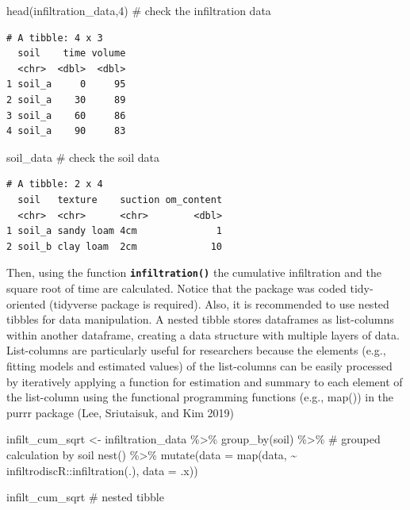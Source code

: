 \documentclass[
]{article}
\newenvironment{Shaded}{\begin{snugshade}}{\end{snugshade}}
\newcommand{\AttributeTok}[1]{\textcolor[rgb]{0.40,0.45,0.13}{#1}}
\newcommand{\CommentTok}[1]{\textcolor[rgb]{0.37,0.37,0.37}{#1}}
\newcommand{\DecValTok}[1]{\textcolor[rgb]{0.68,0.00,0.00}{#1}}
\newcommand{\FunctionTok}[1]{\textcolor[rgb]{0.28,0.35,0.67}{#1}}
\newcommand{\NormalTok}[1]{\textcolor[rgb]{0.00,0.23,0.31}{#1}}
\newcommand{\OtherTok}[1]{\textcolor[rgb]{0.00,0.23,0.31}{#1}}
\newcommand{\SpecialCharTok}[1]{\textcolor[rgb]{0.37,0.37,0.37}{#1}}
\begin{document}
\begin{Shaded}
\begin{Highlighting}[]
\FunctionTok{head}\NormalTok{(infiltration\_data,}\DecValTok{4}\NormalTok{) }\CommentTok{\# check the infiltration data}
\end{Highlighting}
\end{Shaded}

\begin{verbatim}
# A tibble: 4 x 3
  soil    time volume
  <chr>  <dbl>  <dbl>
1 soil_a     0     95
2 soil_a    30     89
3 soil_a    60     86
4 soil_a    90     83
\end{verbatim}

\begin{Shaded}
\begin{Highlighting}[]
\NormalTok{soil\_data }\CommentTok{\# check the soil data}
\end{Highlighting}
\end{Shaded}

\begin{verbatim}
# A tibble: 2 x 4
  soil   texture    suction om_content
  <chr>  <chr>      <chr>        <dbl>
1 soil_a sandy loam 4cm              1
2 soil_b clay loam  2cm             10
\end{verbatim}

\newpage{}

Then, using the function \textbf{\texttt{infiltration()}} the cumulative
infiltration and the square root of time are calculated. Notice that the
package was coded tidy-oriented (tidyverse package is required). Also,
it is recommended to use nested tibbles for data manipulation. A nested
tibble stores dataframes as list-columns within another dataframe,
creating a data structure with multiple layers of data. List-columns are
particularly useful for researchers because the elements (e.g., fitting
models and estimated values) of the list-columns can be easily processed
by iteratively applying a function for estimation and summary to each
element of the list-column using the functional programming functions
(e.g., map()) in the purrr package (Lee, Sriutaisuk, and Kim 2019)

\begin{Shaded}
\begin{Highlighting}[]
\NormalTok{infilt\_cum\_sqrt }\OtherTok{\textless{}{-}}
\NormalTok{infiltration\_data }\SpecialCharTok{\%\textgreater{}\%} 
\FunctionTok{group\_by}\NormalTok{(soil) }\SpecialCharTok{\%\textgreater{}\%} \CommentTok{\# grouped calculation by soil}
\FunctionTok{nest}\NormalTok{() }\SpecialCharTok{\%\textgreater{}\%} 
\FunctionTok{mutate}\NormalTok{(}\AttributeTok{data =} \FunctionTok{map}\NormalTok{(data, }\SpecialCharTok{\textasciitilde{}}\NormalTok{ infiltrodiscR}\SpecialCharTok{::}\FunctionTok{infiltration}\NormalTok{(.), }\AttributeTok{data =}\NormalTok{ .x)) }

\NormalTok{infilt\_cum\_sqrt }\CommentTok{\# nested tibble}
\end{Highlighting}
\end{Shaded}
\end{document}
